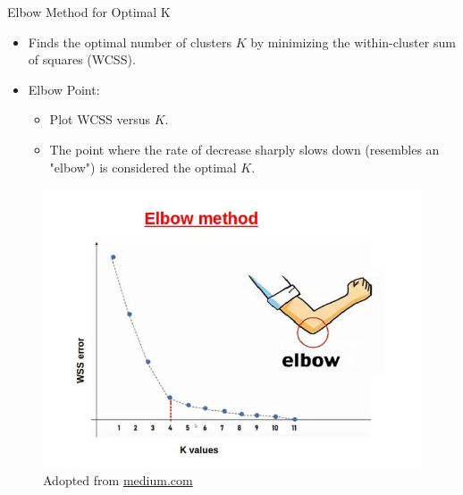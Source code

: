 \documentclass[serif, aspectratio=169]{beamer}
\begin{document}
\begin{frame}{Elbow Method for Optimal K}
    \begin{itemize}
        \item Finds the optimal number of clusters $K$ by minimizing the within-cluster sum of squares (WCSS).
        \item Elbow Point:
        \begin{itemize}
            \item Plot WCSS versus $K$.
            \item The point where the rate of decrease sharply slows down (resembles an "elbow") is considered the optimal $K$.
        \end{itemize}
    \end{itemize}
    \begin{figure}
        \centering
        \includegraphics[scale = 0.45]{pic/figs/elbow.jpg}
         {\scriptsize Adopted from  \href{https://medium.com/@zalarushirajsinh07/the-elbow-method-finding-the-optimal-number-of-clusters-d297f5aeb189}{medium.com}}
        
        \label{fig:my_label}
    \end{figure}
\end{frame}
\end{document}
